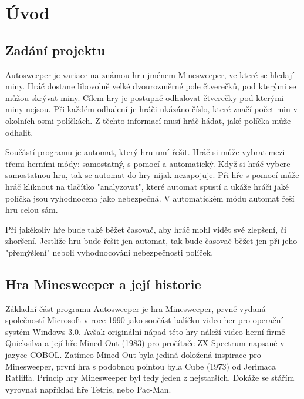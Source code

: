\section{Úvod}
\subsection{Zadání projektu}
Autosweeper je variace na známou hru jménem Minesweeper, ve které se hledají miny. Hráč dostane libovolně velké dvourozměrné
pole čtverečků, pod kterými se můžou skrývat miny. Cílem hry je postupně odhalovat čtverečky pod kterými miny nejsou.
Při každém odhalení je hráči ukázáno číslo, které značí počet min v okolních osmi políčkách. Z těchto informací musí hráč 
hádat, jaké políčka může odhalit.

Součástí programu je automat, který hru umí řešit. Hráč si může vybrat mezi třemi herními módy: samostatný, s pomocí a
automatický. Když si hráč vybere samostatnou hru, tak se automat do hry nijak nezapojuje. Při hře s pomocí může hráč
kliknout na tlačítko "analyzovat", které automat spustí a ukáže hráči jaké políčka jsou vyhodnocena jako nebezpečná.
V automatickém módu automat řeší hru celou sám.

Při jakékoliv hře bude také běžet časovač, aby hráč mohl vidět své zlepšení, či zhoršení. Jestliže hru bude řešit
jen automat, tak bude časovač běžet jen při jeho "přemýšlení" neboli vyhodnocování nebezpečnosti políček.

\subsection{Hra Minesweeper a její historie}
Základní část programu Autosweeper je hra Minesweeper, prvně vydaná společností Microsoft v roce 1990 jako součást balíčku 
video her pro operační systém Windows 3.0. Avšak originální nápad této hry náleží video herní firmě Quicksilva a její hře
Mined-Out (1983) pro pročítače ZX Spectrum napsané v jazyce COBOL. Zatímco Mined-Out byla jediná doložená inspirace pro
Minesweeper, první hra s podobnou pointou byla Cube (1973) od Jerimaca Ratliffa. Princip hry Minesweeper byl tedy jeden z
nejstarších. Dokáže se stářím vyrovnat například hře Tetris, nebo Pac-Man. \autocite{minesweeperinfo}
